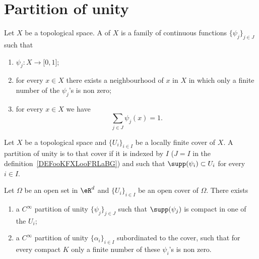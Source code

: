 \section{Partition of unity}


\begin{definition}       \label{DEFooKFXLooFRLaBG}
    Let \( X\) be a topological space. A  of \( X\) is a family of continuous functions \( \{ \psi_j \}_{j\in J}\) such that
    \begin{enumerate}
        \item
            \( \psi_j\colon X\to \mathopen[ 0 , 1 \mathclose]\);
        \item
            for every \( x\in X\) there exists a neighbourhood of \( x\) in \( X\) in which only a finite number of the \( \psi_j\)'s is non zero;
        \item
            for every \( x\in X\) we have
            \begin{equation}
                \sum_{j\in J}\psi_j(x)=1.
            \end{equation}
    \end{enumerate}
\end{definition}

\begin{definition}
    Let \( X\) be a topological space and \( \{ U_i \}_{i\in I}\) be a locally finite cover of \( X\). A partition of unity is  to that cover if it is indexed by \( I\) (\( J=I\) in the definition~\ref{DEFooKFXLooFRLaBG}) and such that \( \supp(\psi_i)\subset U_i\) for every \( i\in I\).
\end{definition}

\begin{theorem}      \label{THOooPCHDooITWKpC}
    Let \( \Omega\) be an open set in \( \eR^d\) and \( \{ U_i \}_{i\in I}\) be an open cover of \( \Omega\). There exists
    \begin{enumerate}
        \item
            a \(  C^{\infty}\) partition of unity \( \{ \psi_j \}_{j\in J}\) such that \( \supp(\psi_j)\) is compact in one of the \( U_i\);
        \item       \label{ITEMooFGMJooQPLqGY}
            a \(  C^{\infty}\) partition of unity \( \{ \alpha_i \}_{i\in I}\) subordinated to the cover, such that for every compact \( K\) only a finite number of these \( \psi_i\)'s is non zero.
    \end{enumerate}
\end{theorem}

